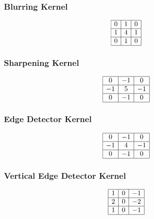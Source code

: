 \documentclass[11pt]{article}
\begin{document}
\subsubsection{Blurring Kernel}
\begin{equation}
    \begin{array}{|c|c|c|}
        \hline 0 & {1} & {0} \\
        \hline 1 & {4} & {1} \\
        \hline 0 & {1} & {0} \\
        \hline
    \end{array}
\end{equation}

\subsubsection{Sharpening Kernel}
\begin{equation}
    \begin{array}{|c|c|c|}
        \hline 0 & {-1} & {0} \\
        \hline -1 & {5} & {-1} \\
        \hline 0 & {-1} & {0} \\
        \hline
    \end{array}
\end{equation}

\subsubsection{Edge Detector Kernel}
\begin{equation}
    \begin{array}{|c|c|c|}
        \hline 0 & {-1} & {0} \\
        \hline-1 & {4} & {-1} \\
        \hline 0 & {-1} & {0} \\
        \hline
    \end{array}
\end{equation}

\subsubsection{Vertical Edge Detector Kernel}
    \begin{equation}
        \begin{array}{|c|c|c|}
        \hline 1 & {0} & {-1} \\
        \hline 2 & {0} & {-2} \\
        \hline 1 & {0} & {-1} \\
        \hline
    \end{array}
\end{equation}
\end{document}
